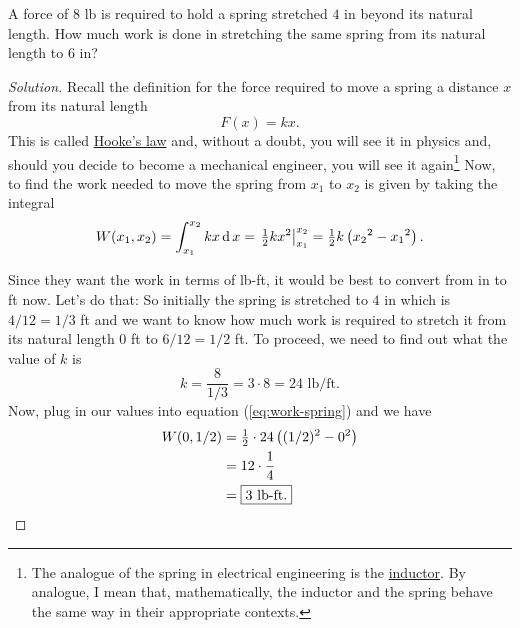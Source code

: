 \begin{problem}
A force of $8$ lb is required to hold a spring stretched $4$ in beyond its
natural length. How much work is done in stretching the same spring from
its natural length to $6$ in?
\end{problem}
\begin{proof}[Solution]
Recall the definition for the force required to move a spring a distance
$x$ from its natural length
\begin{equation}
\label{eq:hookes-law}
F(x)=kx.
\end{equation}
This is called \href{https://en.wikipedia.org/wiki/Hooke's_law}{Hooke's
  law} and, without a doubt, you will see it in physics and, should you
decide to become a mechanical engineer, you will see it again\footnote{The
  analogue of the spring in electrical engineering is the
  \href{https://en.wikipedia.org/wiki/Inductor}{inductor}. By analogue, I
  mean that, mathematically, the inductor and the spring behave the same
  way in their appropriate contexts.} Now, to find the work needed to move
the spring from $x_1$ to $x_2$ is given by taking the integral
\begin{equation}
  \label{eq:work-spring}
W(x_1,x_2)=\int_{x_1}^{x_2}kx\operatorname{d} x=\left.\tfrac{1}{2}kx^2\right|_{x_1}^{x_2}=\tfrac{1}{2}k\left({x_2}^2-{x_1}^2\right).
\end{equation}

Since they want the work in terms of lb-ft, it would be best to convert
from in to ft now. Let's do that: So initially the spring is stretched to
$4$ in which is $4/12=1/3$ ft and we want to know how much work is required
to stretch it from its natural length $0$ ft to $6/12=1/2$ ft. To proceed,
we need to find out what the value of $k$ is
\[
k=\frac{8}{1/3}=3\cdot 8=\text{$24$ lb$/$ft}.
\]
Now, plug in our values into equation (\ref{eq:work-spring}) and we have
\begin{align*}
W(0,1/2)&=\tfrac{1}{2}\cdot 24\left((1/2)^2-0^2\right)\\
&=12\cdot\frac{1}{4}\\
&=\boxed{3\text{ lb-ft}.}\qedhere
\end{align*}
\end{proof}

